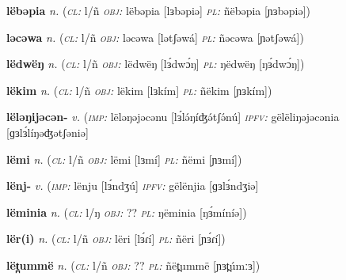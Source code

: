 \newentry
\headword\textbf{lëbəpia} 
\ipa{[lɜbəpiə]}
\synpos\textit{n.} 
\class(\textit{\textsc{cl:}} {l/ñ}
\object\textit{\textsc{obj:}} lëbəpia [lɜbəpiə]
\plural\textit{\textsc{pl:}} ñëbəpia [ɲɜbəpiə])

\newentry
\headword\textbf{ləcəwa} 
\ipa{[lətʃəwá]}
\synpos\textit{n.} 
\class(\textit{\textsc{cl:}} {l/ñ}
\object\textit{\textsc{obj:}} ləcəwa [lətʃəwá]
\plural\textit{\textsc{pl:}} ñəcəwa [ɲətʃəwá])

\newentry
\headword\textbf{lëdwëŋ} 
\ipa{[lɜ́dwɔ́ŋ]}
\synpos\textit{n.} 
\class(\textit{\textsc{cl:}} {l/ñ}
\object\textit{\textsc{obj:}} lëdwëŋ [lɜ́dwɔ́ŋ]
\plural\textit{\textsc{pl:}} ŋëdwëŋ [ŋɜ́dwɔ́ŋ])

\newentry
\headword\textbf{lëkim} 
\ipa{[lɜkím]}
\synpos\textit{n.} 
\class(\textit{\textsc{cl:}} {l/ñ}
\object\textit{\textsc{obj:}} lëkim [lɜkím]
\plural\textit{\textsc{pl:}} ñëkim [ɲɜkím])
 
\newentry
\headword\textbf{lëləŋijəcən-}  
\ipa{[lɜ́lə́ŋíʤə́tʃə́n-]}
\synpos\textit{v.} 
\imperative(\textit {\textsc{imp:}} lëləŋəjəcənu [lɜ́lə́ŋíʤə́tʃə́nú]  
\imperfective\textit{\textsc{ipfv:}} gëlëliŋəjəcənia [ɡɜlɜ́líŋəʤətʃəniə]


\newentry
\headword\textbf{lëmi} 
\ipa{[lɜmí]}
\synpos\textit{n.} 
\class(\textit{\textsc{cl:}} {l/ñ}
\object\textit{\textsc{obj:}} lëmi [lɜmí]
\plural\textit{\textsc{pl:}} ñëmi [ɲɜmí])

\newentry
\headword\textbf{lënj-}  
\ipa{[lɜ́ndʒ-]}
\synpos\textit{v.} 
\imperative(\textit {\textsc{imp:}} lënju [lɜ́ndʒú]  
\imperfective\textit{\textsc{ipfv:}} gëlënjia [ɡɜlɜ́ndʒiə]

\newentry
\headword\textbf{lëminia} 
\ipa{[lɜ́míníə]}
\synpos\textit{n.} 
\class(\textit{\textsc{cl:}} {l/ŋ}
\object\textit{\textsc{obj:}} ??
\plural\textit{\textsc{pl:}} ŋëminia [ŋɜ́míníə])

\newentry
\headword\textbf{lër(i)} 
\ipa{[lɜ́ɾ(í)]}
\synpos\textit{n.} 
\class(\textit{\textsc{cl:}} {l/ñ}
\object\textit{\textsc{obj:}} lëri [lɜ́ɾí]
\plural\textit{\textsc{pl:}} ñëri [ɲɜ́ɾí])

\newentry
\headword\textbf{lët̪ummë} 
\synpos\textit{n.} 
\class(\textit{\textsc{cl:}} {l/ñ}
\object\textit{\textsc{obj:}} ??
\plural\textit{\textsc{pl:}} ñët̪ummë [ɲɜt̪úmːɜ])

